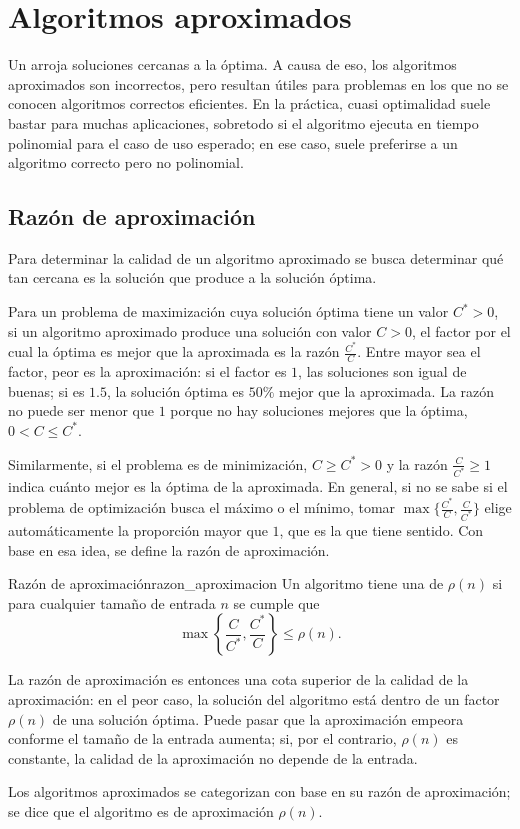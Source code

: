 \section{Algoritmos aproximados}

Un  arroja soluciones cercanas a la óptima. A causa de eso, los algoritmos aproximados son incorrectos, pero resultan útiles para problemas en los que no se conocen algoritmos correctos eficientes. En la práctica, cuasi optimalidad suele bastar para muchas aplicaciones, sobretodo si el algoritmo ejecuta en tiempo polinomial para el caso de uso esperado; en ese caso, suele preferirse a un algoritmo correcto pero no polinomial.

\subsection{Razón de aproximación}

Para determinar la calidad de un algoritmo aproximado se busca determinar qué tan cercana es la solución que produce a la solución óptima. 

Para un problema de maximización cuya solución óptima tiene un valor \(C^* > 0\), si un algoritmo aproximado produce una solución con valor \(C > 0\), el factor por el cual la óptima es mejor que la aproximada es la razón \(\frac{C^*}{C}\). Entre mayor sea el factor, peor es la aproximación: si el factor es \(1\), las soluciones son igual de buenas; si es \(1.5\), la solución óptima es \(50\%\) mejor que la aproximada. La razón no puede ser menor que \(1\) porque no hay soluciones mejores que la óptima, \(0 < C \leq C^*\).

Similarmente, si el problema es de minimización, \(C \geq C^* > 0\) y la razón \(\frac{C}{C^*} \geq 1\) indica cuánto mejor es la óptima de la aproximada. En general, si no se sabe si el problema de optimización busca el máximo o el mínimo, tomar \(\max\{\frac{C^*}{C}, \frac{C}{C^*}\}\) elige automáticamente la proporción mayor que \(1\), que es la que tiene sentido. Con base en esa idea, se define la razón de aproximación.

\begin{definicion}{Razón de aproximación}{razon_aproximacion}
  Un algoritmo tiene una  de \(\rho(n)\) si para cualquier tamaño de entrada \(n\) se cumple que \[\max\left\{\frac{C}{C^*}, \frac{C^*}{C}\right\} \leq \rho(n).\]
\end{definicion}

La razón de aproximación es entonces una cota superior de la calidad de la aproximación: en el peor caso, la solución del algoritmo está dentro de un factor \(\rho(n)\) de una solución óptima. Puede pasar que la aproximación empeora conforme el tamaño de la entrada aumenta; si, por el contrario, \(\rho(n)\) es constante, la calidad de la aproximación no depende de la entrada.

Los algoritmos aproximados se categorizan con base en su razón de aproximación; se dice que el algoritmo es de aproximación \(\rho(n)\).


